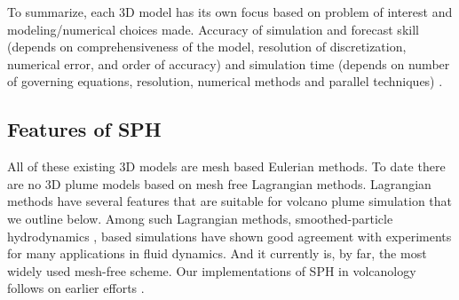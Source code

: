 \documentclass[journal abbreviation, manuscript]{copernicus}
\begin{document}
To summarize, each 3D model has its own focus based on problem of interest and modeling/numerical choices made.
 Accuracy of simulation and forecast skill (depends on comprehensiveness of the model, resolution of discretization, numerical error, and order of accuracy) and simulation time (depends on number of governing equations, resolution, numerical methods and parallel techniques) .%
%
\subsection{Features of SPH}
All of these existing 3D models are mesh based Eulerian methods. To date there are no 3D plume models based on mesh free Lagrangian methods. Lagrangian methods have several features that are suitable for volcano plume simulation that we outline below. Among such Lagrangian methods, smoothed-particle hydrodynamics \citep{gingold1977smoothed,lucy1977numerical}, %
 based simulations have shown good agreement with experiments for many applications in fluid dynamics. And it currently is, by far, the most widely used mesh-free scheme. Our implementations of SPH in volcanology follows on earlier efforts   \citep{bursik2003smoothed,herault2010sph,haddad2016smoothed}.
 
\end{document}
